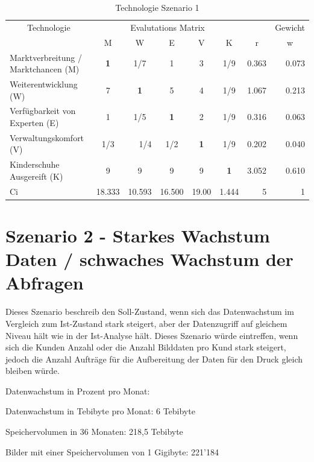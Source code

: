 \begin{table}[htbp]
\caption{Technologie Szenario 1}
\begin{tabular}{|p{3.9cm}|c|c|c|c|c|r|r|}
\hline
\multicolumn{ 1}{|c|}{Technologie} & \multicolumn{ 5}{c|}{Evalutations Matrix} & \multicolumn{1}{l|}{} & \multicolumn{1}{l|}{Gewicht} \\ \cline{ 2- 8}
\multicolumn{ 1}{|c|}{} & M & W & E & V & K & \multicolumn{1}{c|}{r} & \multicolumn{1}{c|}{w} \\ \hline
Marktverbreitung / Marktchancen (M) & \textbf{1} &  1/7 & 1 & 3 &  1/9 & 0.363 & 0.073 \\ \hline
Weiterentwicklung (W) & 7 & \textbf{1} & 5 & 4 &  1/9 & 1.067 & 0.213 \\ \hline
Verfügbarkeit von Experten (E) & 1 &  1/5 & \textbf{1} & 2 &  1/9 & 0.316 & 0.063 \\ \hline
Verwaltungskomfort (V) &  1/3 & \multicolumn{1}{r|}{ 1/4} &  1/2 & \textbf{1} &  1/9 & 0.202 & 0.040 \\ \hline
Kinderschuhe Ausgereift (K) & 9 & 9 & 9 & 9 & \textbf{1} & 3.052 & 0.610 \\ \hline  \hline
Ci & \multicolumn{1}{r|}{18.333} & \multicolumn{1}{r|}{10.593} & \multicolumn{1}{r|}{16.500} & \multicolumn{1}{r|}{19.00} & \multicolumn{1}{r|}{1.444} & 5 & 1 \\ \hline
\end{tabular}
\label{AHPTechnologieS1}
\end{table}



\section{Szenario 2 - Starkes Wachstum Daten / schwaches Wachstum der Abfragen}
Dieses Szenario beschreib den Soll-Zustand, wenn sich das Datenwachstum im Vergleich zum Ist-Zustand stark steigert, aber der Datenzugriff auf gleichem Niveau hält wie in der Ist-Analyse hält. Dieses Szenario würde eintreffen, wenn sich die Kunden Anzahl oder die Anzahl Bilddaten pro Kund stark steigert, jedoch die Anzahl Aufträge für die Aufbereitung der Daten für den Druck gleich bleiben würde.

Datenwachstum in Prozent pro Monat: 

Datenwachstum in Tebibyte pro Monat: 6 Tebibyte

Speichervolumen in 36 Monaten: 218,5 Tebibyte

Bilder mit einer Speichervolumen von 1 Gigibyte: 221'184

